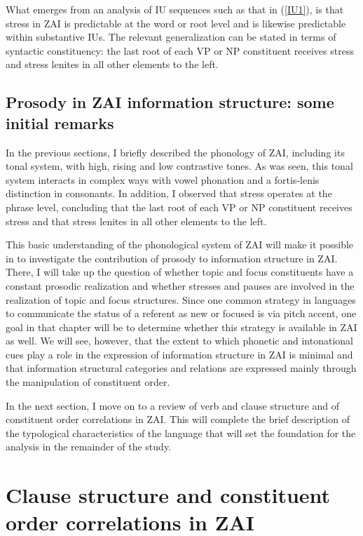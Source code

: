 What emerges from an analysis of IU sequences such as that in (\ref{IU1}), is that stress in ZAI is predictable at the word or root level and is likewise predictable within substantive IUs. The relevant generalization can be stated in terms of syntactic constituency: the last root of each VP or NP constituent receives stress and stress lenites in all other elements to the left. 


\subsection{Prosody in ZAI information structure: some initial remarks}\label{prosodyis}

In the previous sections, I briefly described the phonology of ZAI, including its tonal system, with high, rising and low contrastive tones. As was seen, this tonal system interacts in complex ways with vowel phonation and a fortis-lenis distinction in consonants. In addition, I observed that stress operates at the phrase level, concluding that the last root of each VP or NP constituent receives stress and that stress lenites in all other elements to the left. 

This basic understanding of the phonological system of ZAI will make it possible in  to investigate the contribution of prosody to information structure in ZAI. There, I will take up the question of whether topic and focus constituents have a constant prosodic realization and whether stresses and pauses are involved in the realization of topic and focus structures. Since one common strategy in languages to communicate the status of a referent as new or focused is via pitch accent, one goal in that chapter will be to determine whether this strategy is available in ZAI as well. We will see, however, that the extent to which phonetic and intonational cues play a role in the expression of information structure in ZAI is minimal and that information structural categories and relations are expressed mainly through the manipulation of constituent order.

In the next section, I move on to a review of verb and clause structure and of constituent order correlations in ZAI. This will complete the brief description of the typological characteristics of the language that will set the foundation for the analysis in the remainder of the study.


\section{Clause structure and constituent order correlations in ZAI}\label{wordorder}



